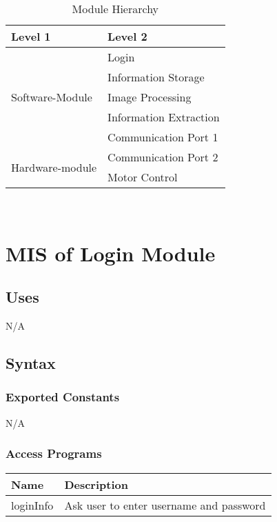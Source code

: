 \documentclass[12pt, titlepage]{article}
\begin{document}
\begin{table}[h!]
\centering
\begin{tabular}{p{} p{}}
\toprule
\textbf{Level 1} & \textbf{Level 2}\\
\midrule

\multirow{5}{0.3\textwidth}{Software-Module} & 
Login  \\
& Information Storage \\
& Image Processing \\
& Information Extraction \\
& Communication Port 1 \\
\midrule

\multirow{2}{0.3\textwidth}{Hardware-module} & Communication Port 2\\
& Motor Control\\


\bottomrule

\end{tabular}
\caption{Module Hierarchy}
\label{TblMH}
\end{table}

\newpage
~\newpage

\section{MIS of Login Module} 



\subsection{Uses}
N/A

\subsection{Syntax}

\subsubsection{Exported Constants}
N/A

\subsubsection{Access Programs}

\begin{center}
\begin{tabular}{p{4cm} p{8cm} }
\hline
\textbf{Name} & \textbf{Description}  \\
\hline
loginInfo & Ask user to enter username and password \\
\hline

\end{tabular}
\end{center}
\end{document}

